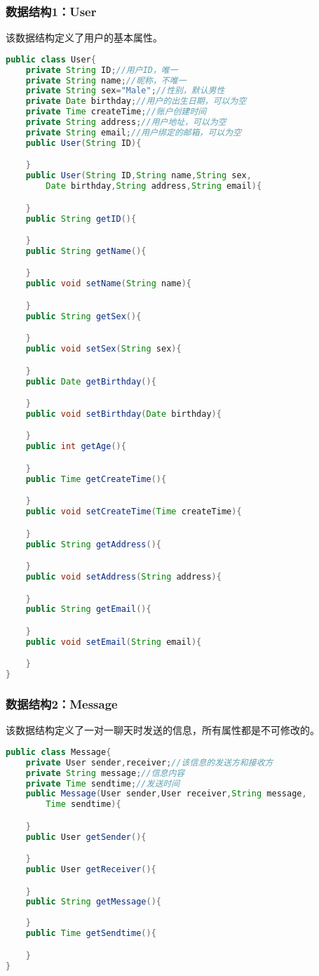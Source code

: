 \subsubsection{数据结构1：User}
该数据结构定义了用户的基本属性。
\begin{lstlisting}[language=Java, caption=User定义]
public class User{
    private String ID;//用户ID，唯一
    private String name;//昵称，不唯一
    private String sex="Male";//性别，默认男性
    private Date birthday;//用户的出生日期，可以为空
    private Time createTime;//账户创建时间
    private String address;//用户地址，可以为空
    private String email;//用户绑定的邮箱，可以为空
    public User(String ID){

    }
    public User(String ID,String name,String sex,
        Date birthday,String address,String email){

    }
    public String getID(){

    }
    public String getName(){

    }
    public void setName(String name){

    }
    public String getSex(){

    }
    public void setSex(String sex){

    }
    public Date getBirthday(){

    }
    public void setBirthday(Date birthday){

    }
    public int getAge(){

    }
    public Time getCreateTime(){

    }
    public void setCreateTime(Time createTime){

    }
    public String getAddress(){

    }
    public void setAddress(String address){

    }
    public String getEmail(){

    }
    public void setEmail(String email){

    }
}
\end{lstlisting}

\subsubsection{数据结构2：Message}
该数据结构定义了一对一聊天时发送的信息，所有属性都是不可修改的。
\begin{lstlisting}[language=Java, caption=Message定义]
public class Message{
    private User sender,receiver;//该信息的发送方和接收方
    private String message;//信息内容
    private Time sendtime;//发送时间
    public Message(User sender,User receiver,String message,
        Time sendtime){

    }
    public User getSender(){

    }
    public User getReceiver(){

    }
    public String getMessage(){
        
    }
    public Time getSendtime(){

    }
}
\end{lstlisting}
    
